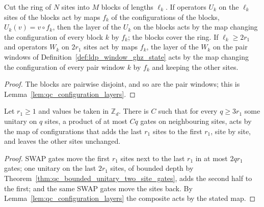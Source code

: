 \begin{lemma}
    \label{lem:ldp_block_layers_configurations}
    \leanok
    Cut the ring of $N$ sites into $M$ blocks of lengths $\ell_k$. If operators
    $U_k$ on the $\ell_k$ sites of the blocks act by maps $f_k$ of the
    configurations of the blocks, $U_k(v)=v\circ f_k$, then the layer of the
    $U_k$ on the blocks acts by the map changing the configuration of every
    block $k$ by $f_k$; the blocks cover the ring. If $\ell_k\geq2r_1$ and
    operators $W_k$ on $2r_1$ sites act by maps $f_k$, the layer of the $W_k$
    on the pair windows of Definition~\ref{def:ldp_window_ghz_state} acts by
    the map changing the configuration of every pair window $k$ by $f_k$ and
    keeping the other sites.
\end{lemma}
\begin{proof}
    \leanok
    The blocks are pairwise disjoint, and so are the pair windows; this is
    Lemma~\ref{lem:qc_configuration_layers}.
\end{proof}

\begin{lemma}
    \label{lem:ldp_block_shift}
    \leanok
    Let $r_1\geq1$ and values be taken in $\mathbb Z_d$. There is $C$ such
    that for every $q\geq3r_1$ some unitary on $q$ sites, a product of at most
    $Cq$ gates on neighbouring sites, acts by the map of configurations that
    adds the last $r_1$ sites to the first $r_1$, site by site, and leaves the
    other sites unchanged.
\end{lemma}
\begin{proof}
    \leanok
    SWAP gates move the first $r_1$ sites next to the last $r_1$ in at most
    $2qr_1$ gates; one unitary on the last $2r_1$ sites, of bounded depth by
    Theorem~\ref{thm:qc_bounded_unitary_two_site_gates}, adds the second half
    to the first; and the same SWAP gates move the sites back. By
    Lemma~\ref{lem:qc_configuration_layers} the composite acts by the stated
    map.
\end{proof}

